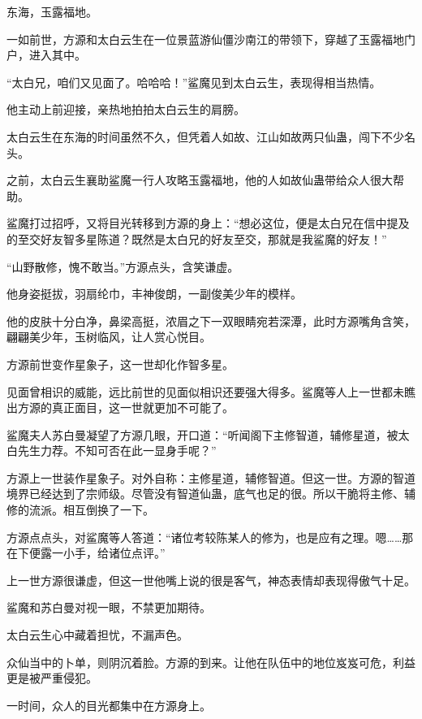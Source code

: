 
\begin{this_body}

东海，玉露福地。

一如前世，方源和太白云生在一位景蓝游仙僵沙南江的带领下，穿越了玉露福地门户，进入其中。

“太白兄，咱们又见面了。哈哈哈！”鲨魔见到太白云生，表现得相当热情。

他主动上前迎接，亲热地拍拍太白云生的肩膀。

太白云生在东海的时间虽然不久，但凭着人如故、江山如故两只仙蛊，闯下不少名头。

之前，太白云生襄助鲨魔一行人攻略玉露福地，他的人如故仙蛊带给众人很大帮助。

鲨魔打过招呼，又将目光转移到方源的身上：“想必这位，便是太白兄在信中提及的至交好友智多星陈道？既然是太白兄的好友至交，那就是我鲨魔的好友！”

“山野散修，愧不敢当。”方源点头，含笑谦虚。

他身姿挺拔，羽扇纶巾，丰神俊朗，一副俊美少年的模样。

他的皮肤十分白净，鼻梁高挺，浓眉之下一双眼睛宛若深潭，此时方源嘴角含笑，翩翩美少年，玉树临风，让人赏心悦目。

方源前世变作星象子，这一世却化作智多星。

见面曾相识的威能，远比前世的见面似相识还要强大得多。鲨魔等人上一世都未瞧出方源的真正面目，这一世就更加不可能了。

鲨魔夫人苏白曼凝望了方源几眼，开口道：“听闻阁下主修智道，辅修星道，被太白先生力荐。不知可否在此一显身手呢？”

方源上一世装作星象子。对外自称：主修星道，辅修智道。但这一世。方源的智道境界已经达到了宗师级。尽管没有智道仙蛊，底气也足的很。所以干脆将主修、辅修的流派。相互倒换了一下。

方源点点头，对鲨魔等人答道：“诸位考较陈某人的修为，也是应有之理。嗯……那在下便露一小手，给诸位点评。”

上一世方源很谦虚，但这一世他嘴上说的很是客气，神态表情却表现得傲气十足。

鲨魔和苏白曼对视一眼，不禁更加期待。

太白云生心中藏着担忧，不漏声色。

众仙当中的卜单，则阴沉着脸。方源的到来。让他在队伍中的地位岌岌可危，利益更是被严重侵犯。

一时间，众人的目光都集中在方源身上。


\end{this_body}
